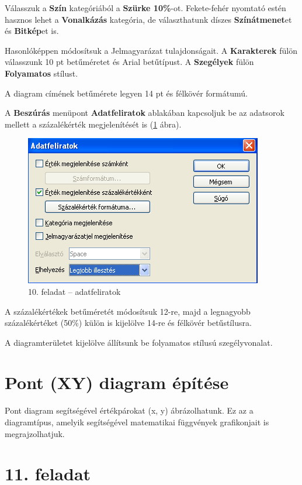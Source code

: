 \clearpage
Válasszuk a \textbf{Szín} kategóriából a \textbf{Szürke
10\%}-ot. Fekete-fehér nyomtató estén hasznos lehet a
\textbf{Vonalkázás} kategória, de választhatunk díszes
\textbf{Színátmenet}et és \textbf{Bitkép}et is.

Hasonlóképpen módosítsuk a Jelmagyarázat tulajdonságait. A
\textbf{Karakterek} fülön válasszunk 10 pt betűméretet és
Arial betűtípust. A \textbf{Szegélyek} fülön
\textbf{Folyamatos} stílust.

A diagram címének betűmérete legyen 14 pt és félkövér
formátumú.

A \textbf{Beszúrás} menüpont \textbf{Adatfeliratok} ablakában
kapcsoljuk be az adatsorok mellett a százalékérték
 megjelenítését is (\ref{10-feladatFeliratok} ábra).

\begin{figure}[!h]
\begin{center}
\includegraphics[width=10.398cm]{oocalcv1-img63.png}
\caption{10.  feladat --  adatfeliratok}\label{10-feladatFeliratok}
\end{center}
\end{figure}

A százalékértékek betűméretét módosítsuk 12-re, majd
a legnagyobb százalékértéket (50\%) külön is kijelölve
14-re és félkövér betűstílusra.

A diagramterületet kijelölve állítsunk be folyamatos stílusú
szegélyvonalat.


\section{Pont (XY) diagram építése}

Pont diagram segítségével értékpárokat (x, y)
ábrázolhatunk. Ez az a diagramtípus, amelyik segítségével
matematikai függvények grafikonjait is megrajzolhatjuk. 


\section[11. feladat]{11. feladat}

